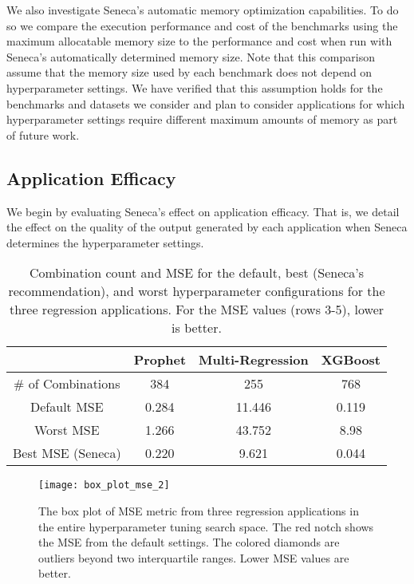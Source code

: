 We also investigate Seneca's automatic memory optimization capabilities.  To
do so we compare the execution performance and cost of the benchmarks using
the maximum allocatable memory size to the performance and cost when run with
Seneca's automatically determined memory size.  Note that this comparison
assume that the memory size used by each benchmark does not depend on
hyperparameter settings.  We have verified that this assumption holds for the
benchmarks and datasets we consider and plan to consider applications for
which hyperparameter settings require different maximum amounts of memory as
part of future work.  

\subsection{Application Efficacy}

We begin by evaluating Seneca's effect on application efficacy.
That is, we detail the effect on the quality of the output generated by each
application when Seneca determines the hyperparameter settings. 

\begin{table}
\centering
\begin{tabular}{|c|c|c|c|}
\hline
& Prophet & Multi-Regression & XGBoost\\
\hline
\# of Combinations & 384 & 255 & 768\\
\hline
\hline
Default MSE & 0.284 & 11.446 & 0.119 \\
\hline
Worst MSE & 1.266 & 43.752 & 8.98 \\
\hline
Best MSE (Seneca) & 0.220 & 9.621 & 0.044 \\
\hline
\end{tabular}
\caption{Combination count and MSE for the default, best (Seneca's recommendation), and worst hyperparameter configurations for the three regression applications. 
For the MSE  values (rows 3-5), lower is better.
\label{tab:mse}}
\end{table}

\begin{figure}[t] \centering 
\texttt{[image: box\_plot\_mse\_2]}
\caption{The box plot of MSE metric from three regression applications in the entire hyperparameter tuning search space. The red notch shows the MSE from the default settings. The colored diamonds are outliers beyond two interquartile ranges. Lower MSE values are better.
\label{fig:box_plot_mse}}
\end{figure}

